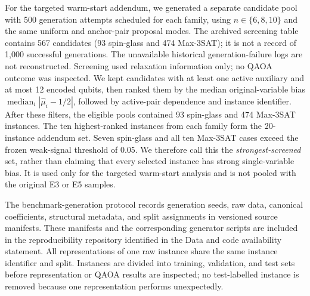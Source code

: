 \documentclass[a4paper,onecolumn,11pt,unpublished]{quantumarticle}
\theoremstyle{remark}
\begin{document}
For the targeted warm-start addendum, we generated a separate candidate pool
with 500 generation attempts scheduled for each family, using
$n\in\{6,8,10\}$ and the same uniform and anchor-pair proposal modes.
The archived screening table contains 567 candidates (93 spin-glass and
474 Max-3SAT); it is not a record of 1,000 successful generations.
The unavailable historical generation-failure logs are not reconstructed.  Screening used relaxation information only;
no QAOA outcome was inspected.  We kept candidates with at least one active
auxiliary and at most 12 encoded qubits, then ranked them by the median
original-variable bias $\operatorname{median}_i|\widehat\mu_i-1/2|$, followed
by active-pair dependence and instance identifier.  After these filters, the
eligible pools contained 93 spin-glass and 474 Max-3SAT instances.  The ten
highest-ranked instances from each family form the 20-instance addendum set.
Seven spin-glass and all ten Max-3SAT cases exceed the frozen weak-signal
threshold of 0.05.  We therefore call this the \emph{strongest-screened} set,
rather than claiming that every selected instance has strong single-variable
bias.  It is used only for the targeted warm-start analysis and is not pooled
with the original E3 or E5 samples.

The benchmark-generation protocol records generation seeds, raw data,
canonical coefficients, structural metadata, and split assignments in
versioned source manifests.  These manifests and the corresponding generator
scripts are included in the reproducibility repository identified in the Data
and code availability statement.  All representations of one raw instance share the same instance
identifier and split.  Instances are divided into training, validation, and
test sets before representation or QAOA results are inspected; no
test-labelled instance is removed because one representation performs
unexpectedly.
\end{document}
